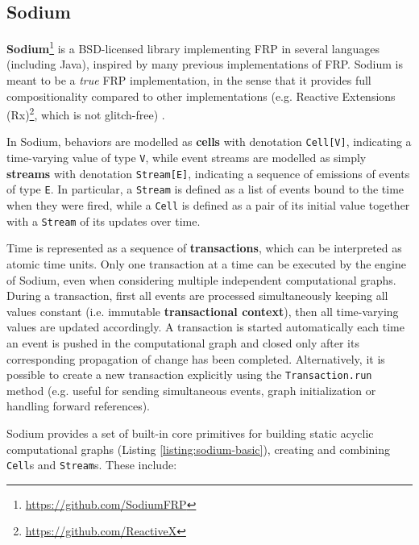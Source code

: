 \subsection{Sodium}

\textbf{Sodium}\footnote{\url{https://github.com/SodiumFRP}} is a
BSD-licensed library implementing \ac{FRP} in several languages (including
Java), inspired by many previous implementations of \ac{FRP}. Sodium
is meant to be a \textit{true} \ac{FRP} implementation, in the sense that it
provides full compositionality compared to other implementations (e.g. Reactive
Extensions (Rx)\footnote{\url{https://github.com/ReactiveX}}, which is not
glitch-free) \cite{FRP}.

In Sodium, behaviors are modelled as \textbf{cells} with denotation
\texttt{Cell[V]}, indicating a time-varying value of type \texttt{V}, while
event streams are modelled as simply \textbf{streams} with denotation
\texttt{Stream[E]}, indicating a sequence of emissions of events of type
\texttt{E}. In particular, a \texttt{Stream} is defined as a list of events
bound to the time when they were fired, while a \texttt{Cell} is defined as a
pair of its initial value together with a \texttt{Stream} of its updates over
time.

Time is represented as a sequence of \textbf{transactions}, which can be
interpreted as atomic time units. Only one transaction at a time can be
executed by the engine of Sodium, even when considering multiple independent
computational graphs. During a transaction, first all events are processed
simultaneously keeping all values constant (i.e. immutable
\textbf{transactional context}), then all time-varying values are updated
accordingly. A transaction is started automatically each time an event is
pushed in the computational graph and closed only after its corresponding
propagation of change has been completed. Alternatively, it is possible to
create a new transaction explicitly using the \texttt{Transaction.run} method
(e.g. useful for sending simultaneous events, graph initialization or handling
forward references).

Sodium provides a set of built-in core primitives for building static acyclic
computational graphs (Listing \ref{listing:sodium-basic}), creating and
combining \texttt{Cell}s and \texttt{Stream}s. These include:

